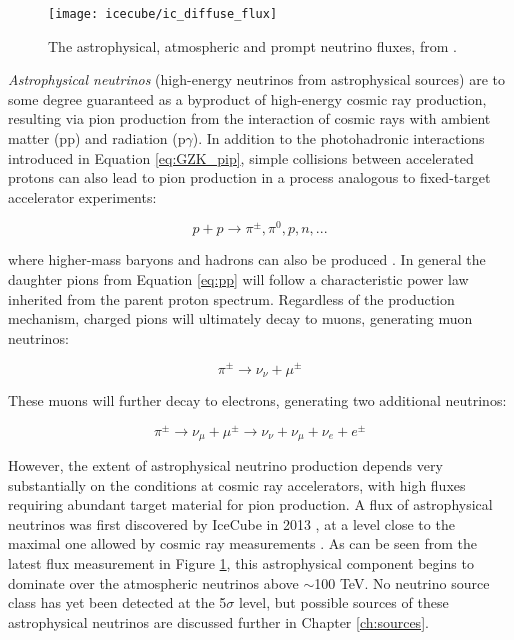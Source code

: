 \begin{figure}
	\centering \texttt{[image: icecube/ic\_diffuse\_flux]}
	\caption{The astrophysical, atmospheric and prompt neutrino fluxes, from \cite{ic_15_joint}.}
	\label{fig:ic_diffuse_flux}
\end{figure}

\emph{Astrophysical neutrinos} (high-energy neutrinos from astrophysical sources) are to some degree guaranteed as a byproduct of high-energy cosmic ray production, resulting via pion production from the interaction of cosmic rays with ambient matter (pp) and radiation (p$\gamma$). In addition to the photohadronic interactions introduced in Equation \ref{eq:GZK_pip}, simple collisions between accelerated protons can also lead to pion production in a process analogous to fixed-target accelerator experiments:

\begin{equation}
	p + p \rightarrow \pi^{\pm}, \pi^{0}, p, n, ...
	\label{eq:pp}
\end{equation}

where higher-mass baryons and hadrons can also be produced \cite{spurio_18}. In general the daughter pions from Equation \ref{eq:pp} will follow a characteristic power law inherited from the parent proton spectrum. Regardless of the production mechanism, charged pions will ultimately decay to muons, generating muon neutrinos:

\begin{equation}
	\pi^{\pm} \rightarrow \nu_{\nu} + \mu^{\pm}
\end{equation}

These muons will further decay to electrons, generating two additional neutrinos:

\begin{equation}
	\pi^{\pm} \rightarrow \nu_{\mu} + \mu^{\pm} \rightarrow \nu_{\nu} + \nu_{\mu} + \nu_{e} + e^{\pm}
\end{equation}

However, the extent of astrophysical neutrino production depends very substantially on the conditions at cosmic ray accelerators, with high fluxes requiring abundant target material for pion production. A flux of astrophysical neutrinos was first discovered by IceCube in 2013 , at a level close to the maximal one allowed by cosmic ray measurements . As can be seen from the latest flux measurement in Figure \ref{fig:ic_diffuse_flux}, this astrophysical component begins to dominate over the atmospheric neutrinos above $\sim$100 TeV. No neutrino source class has yet been detected at the 5$\sigma$ level, but possible sources of these astrophysical neutrinos are discussed further in Chapter \ref{ch:sources}.

